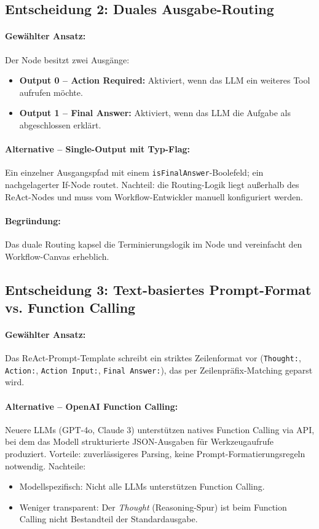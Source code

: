 \documentclass[12pt,a4paper,oneside]{report}
\begin{document}
\subsection{Entscheidung 2: Duales Ausgabe-Routing}

\paragraph{Gewählter Ansatz:}
Der Node besitzt zwei Ausgänge:
\begin{itemize}
  \item \textbf{Output 0 -- Action Required:} Aktiviert, wenn das \ac{LLM} ein
    weiteres Tool aufrufen möchte.
  \item \textbf{Output 1 -- Final Answer:} Aktiviert, wenn das \ac{LLM} die Aufgabe
    als abgeschlossen erklärt.
\end{itemize}

\paragraph{Alternative -- Single-Output mit Typ-Flag:}
Ein einzelner Ausgangspfad mit einem \texttt{isFinalAnswer}-Boolefeld; ein
nachgelagerter If-Node routet. Nachteil: die Routing-Logik liegt außerhalb des
ReAct-Nodes und muss vom Workflow-Entwickler manuell konfiguriert werden.

\paragraph{Begründung:}
Das duale Routing kapsel die Terminierungslogik im Node und vereinfacht den
Workflow-Canvas erheblich.

\subsection{Entscheidung 3: Text-basiertes Prompt-Format vs. Function Calling}

\paragraph{Gewählter Ansatz:}
Das ReAct-Prompt-Template schreibt ein striktes Zeilenformat vor (\texttt{Thought:},
\texttt{Action:}, \texttt{Action Input:}, \texttt{Final Answer:}), das per
Zeilenpräfix-Matching geparst wird.

\paragraph{Alternative -- OpenAI Function Calling:}
Neuere \ac{LLM}s (GPT-4o, Claude 3) unterstützen natives Function Calling via
\ac{API}, bei dem das Modell strukturierte JSON-Ausgaben für Werkzeugaufrufe
produziert. Vorteile: zuverlässigeres Parsing, keine Prompt-Formatierungsregeln
notwendig. Nachteile:
\begin{itemize}
  \item Modellspezifisch: Nicht alle \ac{LLM}s unterstützen Function Calling.
  \item Weniger transparent: Der \textit{Thought} (Reasoning-Spur) ist beim
    Function Calling nicht Bestandteil der Standardausgabe.
\end{itemize}
\end{document}
